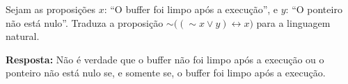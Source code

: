 \documentclass{ufcdocument}
\begin{document}
\def\course{Lógica para Ciência da Computação}
\def\prof{Esdras Lins Bispo Jr.}
\def\semester{2026.1}
\def\codeCourse{ICE0239}
\def\registration{}
\def\student{}
\def\graduate{Bacharelado em Ciência da Computação}
\def\theme{Avaliação da Competência LCC C1.1:\\ \texttt{Conversão da linguagem simbólica para a natural.}\\
14 de abril de 2026
}
    \makeheader
    
    \vspace{0.5cm}
    
        \begin{question}
\item Sejam as proposições $x$: “O buffer foi limpo após a execução”, e $y$: “O ponteiro não está nulo”. Traduza a proposição $\sim \big(  (\sim x \lor y) \leftrightarrow x  \big)$ para a linguagem natural.
\end{question}

    \vspace{0.3cm}
        
    {\color{blue} {\bf Resposta:} Não é verdade que o buffer não foi limpo após a execução ou o ponteiro não está nulo se, e somente se, o buffer foi limpo após a execução.}
 
    \vfill
\end{document}
